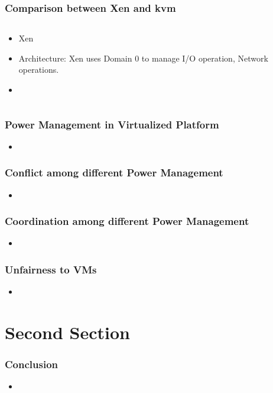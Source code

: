 \documentclass{beamer}
\begin{document}
\begin{frame}
\frametitle{Comparison between Xen and kvm}
\begin{columns}
\begin{column}{0.5\textwidth}
\begin{itemize}
\item Xen
\item Architecture: Xen uses Domain 0 to manage I/O operation, Network operations.
\item 
\end{itemize}
\end{column}
\end{columns}
\end{frame}
\begin{frame}
\frametitle{Power Management in Virtualized Platform}
\begin{itemize}
\item 
\end{itemize}
\end{frame}


\begin{frame}
\frametitle{Conflict among different Power Management}
\begin{itemize}
\item 
\end{itemize}
\end{frame}

\begin{frame}
\frametitle{Coordination among different Power Management}
\begin{itemize}
\item 
\end{itemize}
\end{frame}

\begin{frame}
\frametitle{Unfairness to VMs}
\begin{itemize}
\item 
\end{itemize}
\end{frame}
\section{Second Section}
\begin{frame}
\frametitle{Conclusion}
\begin{itemize}
\item 
\end{itemize}
\end{frame}
\end{document}
